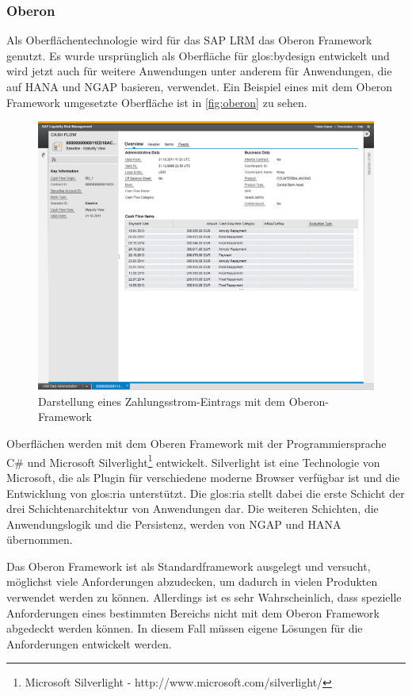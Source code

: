 \begin{onehalfspacing}
\subsubsection{Oberon}
Als Oberflächentechnologie wird für das SAP LRM das Oberon Framework genutzt. Es wurde ursprünglich als Oberfläche für \gls{glos:bydesign} entwickelt und wird jetzt auch für weitere Anwendungen unter anderem für Anwendungen, die auf HANA und NGAP basieren, verwendet. Ein Beispiel eines mit dem Oberon Framework umgesetzte Oberfläche ist in \vref{fig:oberon} zu sehen.

\begin{figure}[h]
\centering
\setlength{\unitlength}{1mm}
\includegraphics[width=15cm]{images/OberonUI.png}
\caption{Darstellung eines Zahlungsstrom-Eintrags mit dem Oberon-Framework\label{fig:oberon}}
\end{figure} 

Oberflächen werden mit dem Oberen Framework mit der Programmiersprache C\# und Microsoft Silverlight\footnote{Microsoft Silverlight - http://www.microsoft.com/silverlight/} entwickelt. Silverlight ist eine Technologie von Microsoft, die als Plugin für verschiedene moderne Browser verfügbar ist und die Entwicklung von \gls{glos:ria} unterstützt. Die \gls{glos:ria} stellt dabei die erste Schicht der drei Schichtenarchitektur von Anwendungen dar. Die weiteren Schichten, die Anwendungslogik und die Persistenz, werden von NGAP und HANA übernommen.

Das Oberon Framework ist als Standardframework ausgelegt und versucht, möglichst viele Anforderungen abzudecken, um dadurch in vielen Produkten verwendet werden zu können. Allerdings ist es sehr Wahrscheinlich, dass spezielle Anforderungen eines bestimmten Bereichs nicht mit dem Oberon Framework abgedeckt werden können. In diesem Fall müssen eigene Lösungen für die Anforderungen entwickelt werden.


\end{onehalfspacing}
